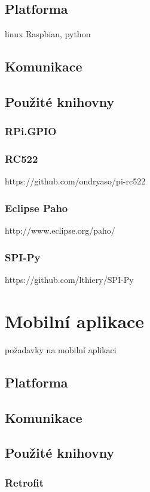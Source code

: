 \documentclass[czech,BP]{thesiskiv}
\begin{document}
	\section{Platforma}
		linux Raspbian, python
	
	\section{Komunikace}
	
	\section{Použité knihovny}
		\subsection{RPi.GPIO}
		\subsection{RC522}
			https://github.com/ondryaso/pi-rc522
		\subsection{Eclipse Paho}
			http://www.eclipse.org/paho/
		\subsection{SPI-Py}
			https://github.com/lthiery/SPI-Py

\chapter{Mobilní aplikace}
	požadavky na mobilní aplikaci

	\section{Platforma}
	
	\section{Komunikace}
		

	\section{Použité knihovny}
		\subsection{Retrofit}
\end{document}
